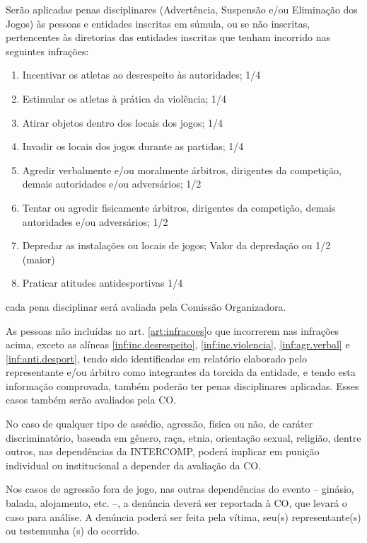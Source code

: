 \begin{article}
	\label{art:infracoes}
	Serão aplicadas penas disciplinares (Advertência, Suspensão e/ou Eliminação dos Jogos) às pessoas e entidades inscritas em súmula, ou se não inscritas, pertencentes às diretorias das entidades inscritas que tenham incorrido nas seguintes infrações:

	\begin{enumerate}[noitemsep]
		\item \label{inf:inc.desrespeito}
			Incentivar os atletas ao desrespeito às autoridades; 1/4
		\item \label{inf:inc.violencia}
			Estimular os atletas à prática da violência; 1/4
		\item Atirar objetos dentro dos locais dos jogos; 1/4
		\item Invadir os locais dos jogos durante as partidas; 1/4
		\item \label{inf:agr.verbal}
			Agredir verbalmente e/ou moralmente árbitros, dirigentes da competição, demais autoridades e/ou adversários; 1/2
		\item Tentar ou agredir fisicamente árbitros, dirigentes da competição, demais autoridades e/ou adversários; 1/2
		\item Depredar as instalações ou locais de jogos; Valor da depredação ou 1/2 (maior)
		\item \label{inf:anti.desport}
			Praticar atitudes antidesportivas 1/4
	\end{enumerate}

	\begin{xparagraph}
		cada pena disciplinar será avaliada pela Comissão Organizadora.
	\end{xparagraph}
\end{article}

\begin{article}
	As pessoas não incluídas no art. \ref{art:infracoes}o que incorrerem nas infrações acima, exceto as alíneas \ref{inf:inc.desrespeito}, \ref{inf:inc.violencia}, \ref{inf:agr.verbal} e \ref{inf:anti.desport}, tendo sido identificadas em relatório elaborado pelo representante e/ou árbitro como integrantes da torcida da entidade, e tendo esta informação comprovada, também poderão ter penas disciplinares aplicadas. Esses casos também serão avaliados pela CO.
\end{article}

\begin{article}
	No caso de qualquer tipo de assédio, agressão, física ou não, de caráter discriminatório, baseada em gênero, raça, etnia, orientação sexual, religião, dentre outros, nas dependências da INTERCOMP, poderá implicar em punição individual ou institucional a depender da avaliação da CO.

	\begin{xparagraph}
		Nos casos de agressão fora de jogo, nas outras dependências do evento -- ginásio, balada, alojamento, etc. --, a denúncia deverá ser reportada à CO, que levará o caso para análise. A denúncia poderá ser feita pela vítima, seu(s) representante(s) ou testemunha (s) do ocorrido.
	\end{xparagraph}
\end{article}
